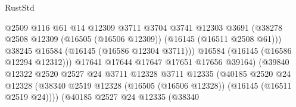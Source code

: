 \begin{lexlean}{RustStd}
\begin{coremodule}
                                              @2509
                                              @116
                                              @61
                                              @14
                                              @12309
                                              @3711
                                              @3704
                                              @3741
                                              @12303
                                              @3691
                                              (@38278
                                                @2508
                                                @12309
                                                (@16505 (@16506 @12309))
                                                (@16145 (@16511 @2508 @61)))
                                              @38245
                                              @16584
                                              (@16145 (@16586 @12304 @3711)))
                                            @16584
                                            (@16145 (@16586 @12294 @12312)))
                                          @17641
                                          @17644
                                          @17647
                                          @17651
                                          @17656
                                          @39164)
                                        (@39840
                                          @12322
                                          @2520
                                          @2527
                                          @24
                                          @3711
                                          @12328
                                          @3711
                                          @12335
                                          (@40185
                                            @2520
                                            @24
                                            @12328
                                            (@38340
                                              @2519
                                              @12328
                                              (@16505 (@16506 @12328))
                                              (@16145 (@16511 @2519 @24))))
                                          (@40185
                                            @2527
                                            @24
                                            @12335
                                            (@38340

\end{coremodule}
\end{lexlean}
